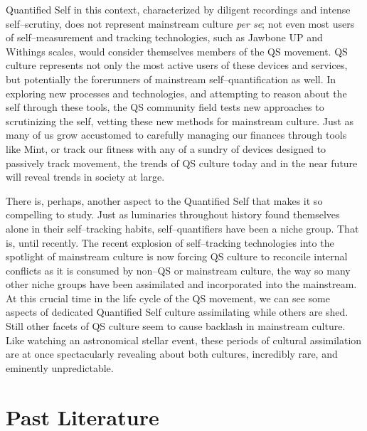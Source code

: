 \documentclass{article}
\begin{document}
Quantified Self in this context,
characterized by diligent recordings and intense self--scrutiny,
does not represent mainstream culture \textit{per se};
not even most users of self--measurement and tracking technologies,
such as Jawbone UP and Withings scales,
would consider themselves members of the QS movement.
QS culture represents not only the most active users of these devices and services,
but potentially the forerunners of mainstream self--quantification as well.
In exploring new processes and technologies,
and attempting to reason about the self through these tools,
the QS community field tests new approaches to scrutinizing the self,
vetting these new methods for mainstream culture.
Just as many of us grow accustomed to carefully managing our finances through tools like Mint,
or track our fitness with any of a sundry of devices designed to passively track movement,
the trends of QS culture today and in the near future will reveal trends in society at large.

There is,
perhaps,
another aspect to the Quantified Self that makes it so compelling to study.
Just as luminaries throughout history found themselves alone in their self--tracking habits,
self--quantifiers have been a niche group.
That is,
until recently.
The recent explosion of self--tracking technologies into the spotlight of mainstream culture is now forcing QS culture to reconcile internal conflicts as it is consumed by non--QS or mainstream culture,
the way so many other niche groups have been assimilated and incorporated into the mainstream.
At this crucial time in the life cycle of the QS movement,
we can see some aspects of dedicated Quantified Self culture assimilating while others are shed.
Still other facets of QS culture seem to cause backlash in mainstream culture.
Like watching an astronomical stellar event,
these periods of cultural assimilation are at once spectacularly revealing about both cultures,
incredibly rare,
and eminently unpredictable.

\section*{Past Literature}
\end{document}
